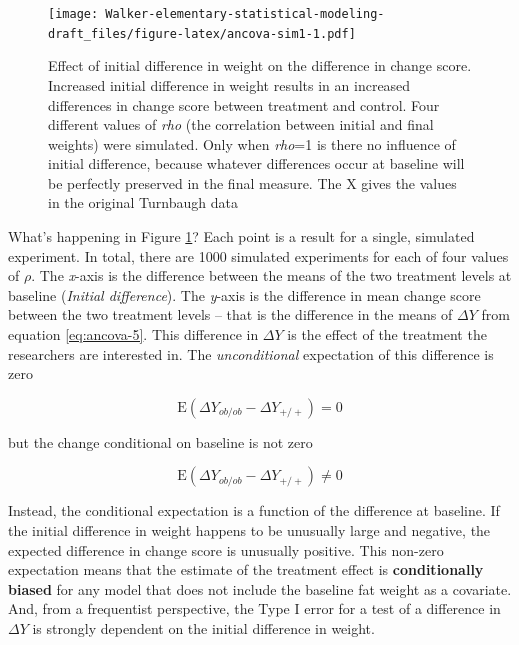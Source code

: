 \documentclass[]{book}
\begin{document}
\begin{figure}
\centering
\texttt{[image: Walker-elementary-statistical-modeling-draft\_files/figure-latex/ancova-sim1-1.pdf]}
\caption{\label{fig:ancova-sim1}Effect of initial difference in weight on
the difference in change score. Increased initial difference in weight
results in an increased differences in change score between treatment
and control. Four different values of \emph{rho} (the correlation
between initial and final weights) were simulated. Only when
\emph{rho}=1 is there no influence of initial difference, because
whatever differences occur at baseline will be perfectly preserved in
the final measure. The X gives the values in the original Turnbaugh
data}
\end{figure}

What's happening in Figure \ref{fig:ancova-sim1}? Each point is a result
for a single, simulated experiment. In total, there are 1000 simulated
experiments for each of four values of \(\rho\). The \emph{x}-axis is
the difference between the means of the two treatment levels at baseline
(\emph{Initial difference}). The \emph{y}-axis is the difference in mean
change score between the two treatment levels -- that is the difference
in the means of \(\Delta Y\) from equation \eqref{eq:ancova-5}. This
difference in \(\Delta Y\) is the effect of the treatment the
researchers are interested in. The \emph{unconditional} expectation of
this difference is zero

\begin{equation}
\mathrm{E}(\Delta Y_{ob/ob} - \Delta Y_{+/+}) = 0
\end{equation}

but the change conditional on baseline is not zero

\begin{equation}
\mathrm{E}(\Delta Y_{ob/ob} - \Delta Y_{+/+}) \ne 0
\end{equation}

Instead, the conditional expectation is a function of the difference at
baseline. If the initial difference in weight happens to be unusually
large and negative, the expected difference in change score is unusually
positive. This non-zero expectation means that the estimate of the
treatment effect is \textbf{conditionally biased} for any model that
does not include the baseline fat weight as a covariate. And, from a
frequentist perspective, the Type I error for a test of a difference in
\(\Delta Y\) is strongly dependent on the initial difference in weight.
\end{document}
